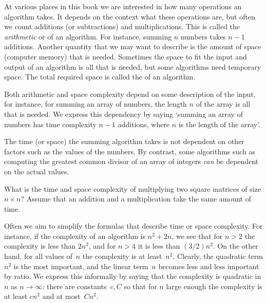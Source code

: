 

At various places in this book we are interested in how many
operations an algorithm takes. It depends on the context what these
operations are, but often we count additions (or subtractions) and
multiplications. This is called the \emph{arithmetic} or
of an algorithm. For
instance, summing $n$ numbers takes $n-1$ additions.  Another quantity
that we may want to describe is the amount of space (computer memory)
that is needed. Sometimes the space to fit the input and output of an
algorithm is all that is needed, but some algorithms need temporary
space. The total required space is called the
of an algorithm.

Both arithmetic and space complexity depend on some description of the
input, for instance, for summing an array of numbers, the length $n$
of the array is all that is needed. We express this dependency by
saying `summing an array of numbers has time complexity $n-1$
additions, where $n$ is the length of the array'.

The time (or space) the summing algorithm takes is not dependent on
other factors such as the values of the numbers.  By contrast, some
algorithms such as computing the greatest common divisor of an array
of integers \emph{can} be dependent on the actual values.

\begin{exercise}
  What is the time and space complexity of multiplying two square
  matrices of size $n\times n$? Assume that an addition and a
  multiplication take the same amount of time.
\end{exercise}

Often we aim to simplify the formulas that describe time or space
complexity. For instance, if the complexity of an algorithm is
$n^2+2n$, we see that for $n>2$ the complexity is less than $2n^2$,
and for $n>4$ it is less than $(3/2)n^2$. On the other hand, for all
values of~$n$ the complexity is at least~$n^2$.  Clearly, the
quadratic term $n^2$ is the most important, and the linear term~$n$
becomes less and less important by ratio. We express this informally
by saying that the complexity is quadratic in $n$ as
$n\rightarrow\infty$: there are constants~$c,C$ so that for $n$ large
enough the complexity is at least $cn^2$ and at most~$Cn^2$. 

